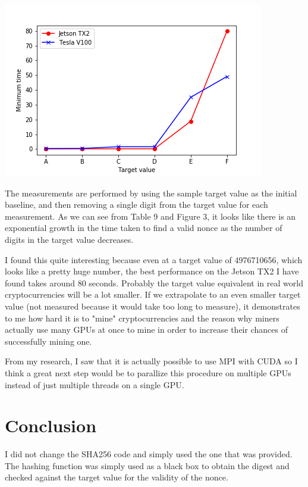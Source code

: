 \documentclass[12pt]{article}
\begin{document}
\begin{center}
	\includegraphics[scale=0.9]{./images/target_difficulty}
\end{center}

\bigbreak \noindent The measurements are performed by using the sample target value as the initial baseline, and then removing a single digit from the target value for each measurement. As we can see from Table 9 and Figure 3, it looks like there is an exponential growth in the time taken to find a valid nonce as the number of digits in the target value decreases.

\bigbreak \noindent I found this quite interesting because even at a target value of 4976710656, which looks like a pretty huge number, the best performance on the Jetson TX2 I have found takes around 80 seconds. Probably the target value equivalent in real world cryptocurrencies will be a lot smaller. If we extrapolate to an even smaller target value (not measured because it would take too long to measure), it demonstrates to me how hard it is to "mine" cryptocurrencies and the reason why miners actually use many GPUs at once to mine in order to increase their chances of successfully mining one.

\bigbreak \noindent From my research, I saw that it is actually possible to use MPI with CUDA so I think a great next step would be to parallize this procedure on multiple GPUs instead of just multiple threads on a single GPU.

\section{Conclusion}

I did not change the SHA256 code and simply used the one that was provided. The hashing function was simply used as a black box to obtain the digest and checked against the target value for the validity of the nonce.
\end{document}
